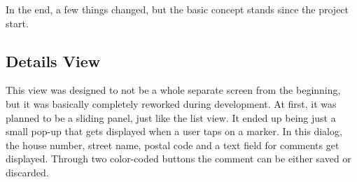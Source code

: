 In the end, a few things changed, but the basic concept stands since the project start.

\subsection{Details View}
This view was designed to not be a whole separate screen from the beginning, but it was basically completely reworked during development. At first, it was planned to be a sliding panel, just like the list view. It ended up being just a small pop-up that gets displayed when a user taps on a marker. In this dialog, the house number, street name, postal code and a text field for comments get displayed. Through two color-coded buttons the comment can be either saved or discarded.

\begin{figure}[H]
    \centering
    \begin{minipage}{0.3\textwidth}
        \centering

\end{minipage}
\end{figure}
